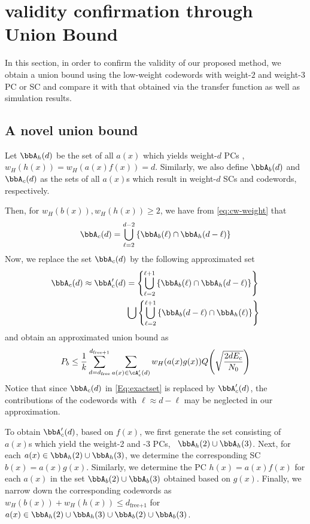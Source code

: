 \section{validity confirmation through Union Bound}
\label{sec4}
 In this section, in order to confirm the validity of our proposed method, we obtain a union bound using the low-weight codewords with weight-$2$ and weight-$3$ PC or SC and compare it with that obtained via the transfer function as well as simulation results.

\subsection{A novel union bound}
Let $\bbA_h(d)$ be the set of all $a(x)$ which yields weight-$d$ PCs \ie, $w_H(h(x))=w_H(a(x)f(x))=d$. Similarly, we also define $\bbA_b(d)$ and $\bbA_c(d)$ as the sets of all $a(x)$s which result in weight-$d$ SCs and codewords, respectively.

Then, for $w_H(b(x)), w_H(h(x)) \geq 2$, we have from \eqref{eq:cw-weight} that
\begin{align}
\bbA_c(d) = \bigcup_{\ell = 2}^{d-2} \left\{\bbA_b(\ell) \cap \bbA_h(d-\ell)\right\}
\label{Eq:exactset}
\end{align}
Now, we replace the set $\bbA_c(d)$ by the following approximated set %
\begin{equation}
\begin{split}
\bbA_c(d) \approx \bbA_c'(d) &= \left\{\bigcup_{\ell = 2}^{\ell+1} \left\{\bbA_b(\ell) \cap \bbA_h(d-\ell)\right\}\right\}\\
&\bigcup \left\{\bigcup_{\ell = 2}^{\ell+1} \left\{\bbA_b(d-\ell) \cap \bbA_h(\ell)\right\}\right\}\\
\end{split}
\label{setApprox}
\end{equation}
and obtain an approximated union bound as
\begin{align}
P_b \leq \frac{1}{k} \sum_{d=d_{\text{free}}}^{d_{\text{free}+1}} \sum_{a(x) \in \cA'_c(d)}w_H(a(x)g(x)) Q\Bigg( \sqrt{\frac{2dE_c}{N_0}}\Bigg)
\label{novelEq7}
\end{align}
Notice that since $\bbA_c(d)$ in \eqref{Eq:exactset} is replaced by $\bbA_c'(d)$, the contributions of the codewords with $\ell \approx d-\ell$ may be neglected in our approximation.

To obtain $\bbA_c'(d)$, based on $f(x)$, we first generate the set consisting of $a(x)$s which yield the weight-2 and -3 PCs, \ie~$\bbA_h(2)\cup\bbA_h(3)$. Next, for each $a(x) \in \bbA_h(2)\cup\bbA_h(3)$, we determine the corresponding SC $b(x)=a(x)g(x)$. Similarly, we determine the PC $h(x)=a(x)f(x)$ for each $a(x)$ in the set $\bbA_b(2)\cup\bbA_b(3)$  obtained based on $g(x)$. Finally, we narrow down the corresponding codewords as $w_H(b(x))+w_H(h(x)) \leq d_{\text{free+1}}$ for $a(x) \in \bbA_h(2)\cup\bbA_h(3)\cup\bbA_b(2)\cup\bbA_b(3)$.

